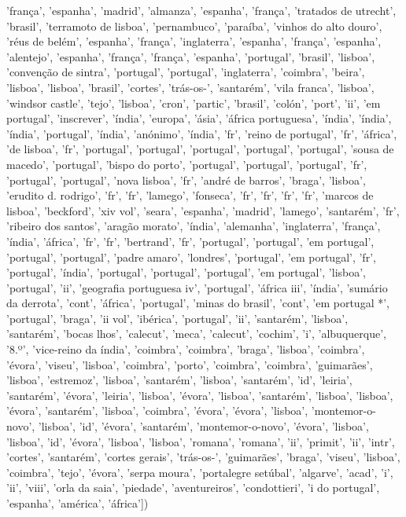 \documentclass{article}
\begin{document}
\begin{itemize}
'frança', 'espanha', 'madrid', 'almanza', 'espanha', 'frança', 'tratados de utrecht', 'brasil', 'terramoto de lisboa', 'pernambuco', 'paraíba', 'vinhos do alto douro', 'réus de belém', 'espanha', 'frança', 'inglaterra', 'espanha', 'frança', 'espanha', 'alentejo', 'espanha', 'frança', 'frança', 'espanha', 'portugal', 'brasil', 'lisboa', 'convenção de sintra', 'portugal', 'portugal', 'inglaterra', 'coimbra', 'beira', 'lisboa', 'lisboa', 'brasil', 'cortes', 'trás-os-', 'santarém', 'vila franca', 'lisboa', 'windsor castle', 'tejo', 'lisboa', 'cron', 'partic', 'brasil', 'colón', 'port', 'ii', 'em portugal', 'inscrever', 'índia', 'europa', 'ásia', 'áfrica portuguesa', 'índia', 'índia', 'índia', 'portugal', 'índia', 'anónimo', 'índia', 'fr', 'reino de portugal', 'fr', 'áfrica', 'de lisboa', 'fr', 'portugal', 'portugal', 'portugal', 'portugal', 'portugal', 'sousa de macedo', 'portugal', 'bispo do porto', 'portugal', 'portugal', 'portugal', 'fr', 'portugal', 'portugal', 'nova lisboa', 'fr', 'andré de barros', 'braga', 'lisboa', 'erudito d. rodrigo', 'fr', 'fr', 'lamego', 'fonseca', 'fr', 'fr', 'fr', 'fr', 'marcos de lisboa', 'beckford', 'xiv vol', 'seara', 'espanha', 'madrid', 'lamego', 'santarém', 'fr', 'ribeiro dos santos', 'aragão morato', 'índia', 'alemanha', 'inglaterra', 'frança', 'índia', 'áfrica', 'fr', 'fr', 'bertrand', 'fr', 'portugal', 'portugal', 'em portugal', 'portugal', 'portugal', 'padre amaro', 'londres', 'portugal', 'em portugal', 'fr', 'portugal', 'índia', 'portugal', 'portugal', 'portugal', 'em portugal', 'lisboa', 'portugal', 'ii', 'geografia portuguesa iv', 'portugal', 'áfrica iii', 'índia', 'sumário da derrota', 'cont', 'áfrica', 'portugal', 'minas do brasil', 'cont', 'em portugal *', 'portugal', 'braga', 'ii vol', 'ibérica', 'portugal', 'ii', 'santarém', 'lisboa', 'santarém', 'bocas lhos', 'calecut', 'meca', 'calecut', 'cochim', 'i', 'albuquerque', '8.º', 'vice-reino da índia', 'coimbra', 'coimbra', 'braga', 'lisboa', 'coimbra', 'évora', 'viseu', 'lisboa', 'coimbra', 'porto', 'coimbra', 'coimbra', 'guimarães', 'lisboa', 'estremoz', 'lisboa', 'santarém', 'lisboa', 'santarém', 'id', 'leiria', 'santarém', 'évora', 'leiria', 'lisboa', 'évora', 'lisboa', 'santarém', 'lisboa', 'lisboa', 'évora', 'santarém', 'lisboa', 'coimbra', 'évora', 'évora', 'lisboa', 'montemor-o-novo', 'lisboa', 'id', 'évora', 'santarém', 'montemor-o-novo', 'évora', 'lisboa', 'lisboa', 'id', 'évora', 'lisboa', 'lisboa', 'romana', 'romana', 'ii', 'primit', 'ii', 'intr', 'cortes', 'santarém', 'cortes gerais', 'trás-os-', 'guimarães', 'braga', 'viseu', 'lisboa', 'coimbra', 'tejo', 'évora', 'serpa moura', 'portalegre setúbal', 'algarve', 'acad', 'i', 'ii', 'viii', 'orla da saia', 'piedade', 'aventureiros', 'condottieri', 'i do portugal', 'espanha', 'américa', 'áfrica'])

\end{itemize}
\end{document}
